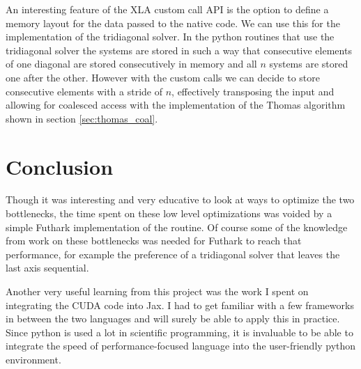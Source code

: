 \documentclass[a4paper,oneside]{memoir}
\begin{document}
An interesting feature of the XLA custom call API is the option to define a memory layout for the data passed to the native code. We can use this for the implementation of the tridiagonal solver. In the python routines that use the tridiagonal solver the systems are stored in such a way that consecutive elements of one diagonal are stored consecutively in memory and all $n$ systems are stored one after the other. However with the custom calls we can decide to store consecutive elements with a stride of $n$, effectively transposing the input and allowing for coalesced access with the implementation of the Thomas algorithm shown in section \ref{sec:thomas_coal}.





\section{Conclusion}

Though it was interesting and very educative to look at ways to optimize the two bottlenecks, the time spent on these low level optimizations was voided by a simple Futhark implementation of the routine. Of course some of the knowledge from work on these bottlenecks was needed for Futhark to reach that performance, for example the preference of a tridiagonal solver that leaves the last axis sequential.

Another very useful learning from this project was the work I spent on integrating the CUDA code into Jax. I had to get familiar with a few frameworks in between the two languages and will surely be able to apply this in practice. Since python is used a lot in scientific programming, it is invaluable to be able to integrate the speed of performance-focused language into the user-friendly python environment.

\newpage
\end{document}
